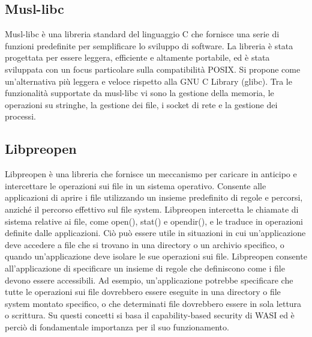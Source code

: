 \subsection{Musl-libc}
Musl-libc è una libreria standard del linguaggio C che fornisce una serie di funzioni predefinite per semplificare lo
sviluppo di software. La libreria è stata progettata per essere leggera, efficiente e altamente portabile, ed è stata
sviluppata con un focus particolare sulla compatibilità POSIX. Si propone come un'alternativa più leggera e veloce
rispetto alla GNU C Library (glibc). Tra le funzionalità supportate da musl-libc vi sono la gestione della memoria, le
operazioni su stringhe, la gestione dei file, i socket di rete e la gestione dei processi.
\subsection{Libpreopen}
Libpreopen è una libreria che fornisce un meccanismo per caricare in anticipo e intercettare le operazioni sui file in
un sistema operativo. Consente alle applicazioni di aprire i file utilizzando un insieme predefinito di regole e
percorsi, anziché il percorso effettivo sul file system. Libpreopen intercetta le chiamate di sistema relative ai file,
come open(), stat() e opendir(), e le traduce in operazioni definite dalle applicazioni. Ciò può essere utile in
situazioni in cui un'applicazione deve accedere a file che si trovano in una directory o un archivio specifico, o quando
un'applicazione deve isolare le sue operazioni sui file. Libpreopen consente all'applicazione di specificare un insieme
di regole che definiscono come i file devono essere accessibili. Ad esempio, un'applicazione potrebbe specificare che
tutte le operazioni sui file dovrebbero essere eseguite in una directory o file system montato specifico, o che
determinati file dovrebbero essere in sola lettura o scrittura. Su questi concetti si basa il capability-based security
di WASI ed è perciò di fondamentale importanza per il suo funzionamento.
